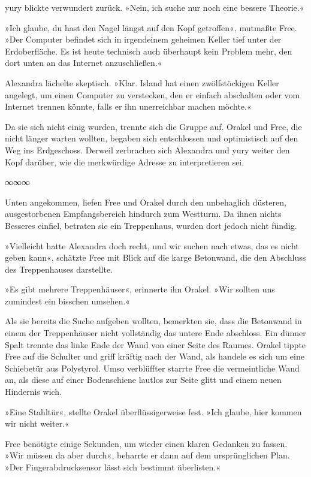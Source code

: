 yury blickte verwundert zurück. »Nein, ich suche nur noch eine bessere Theorie.«

»Ich glaube, du hast den Nagel längst auf den Kopf getroffen«, mutmaßte Free. »Der Computer befindet sich in irgendeinem geheimen Keller tief unter der Erdoberfläche. Es ist heute technisch auch überhaupt kein Problem mehr, den dort unten an das Internet anzuschließen.«

Alexandra lächelte skeptisch. »Klar. Island hat einen zwölfstöckigen Keller angelegt, um einen Computer zu verstecken, den er einfach abschalten oder vom Internet trennen könnte, falls er ihn unerreichbar machen möchte.«

Da sie sich nicht einig wurden, trennte sich die Gruppe auf. Orakel und Free, die nicht länger warten wollten, begaben sich entschlossen und optimistisch auf den Weg ins Erdgeschoss. Derweil zerbrachen sich Alexandra und yury weiter den Kopf darüber, wie die merkwürdige Adresse zu interpretieren sei.

\begin{center}
	∞∞∞
\end{center}

Unten angekommen, liefen Free und Orakel durch den unbehaglich düsteren, ausgestorbenen Empfangsbereich hindurch zum Westturm. Da ihnen nichts Besseres einfiel, betraten sie ein Treppenhaus, wurden dort jedoch nicht fündig.

»Vielleicht hatte Alexandra doch recht, und wir suchen nach etwas, das es nicht geben kann«, schätzte Free mit Blick auf die karge Betonwand, die den Abschluss des Treppenhauses darstellte.

»Es gibt mehrere Treppenhäuser«, erinnerte ihn Orakel. »Wir sollten uns zumindest ein bisschen umsehen.«

Als sie bereits die Suche aufgeben wollten, bemerkten sie, dass die Betonwand in einem der Treppenhäuser nicht vollständig das untere Ende abschloss. Ein dünner Spalt trennte das linke Ende der Wand von einer Seite des Raumes. Orakel tippte Free auf die Schulter und griff kräftig nach der Wand, als handele es sich um eine Schiebetür aus Polystyrol. Umso verblüffter starrte Free die vermeintliche Wand an, als diese auf einer Bodenschiene lautlos zur Seite glitt und einem neuen Hindernis wich.

»Eine Stahltür«, stellte Orakel überflüssigerweise fest. »Ich glaube, hier kommen wir nicht weiter.«

Free benötigte einige Sekunden, um wieder einen klaren Gedanken zu fassen. »Wir müssen da aber durch«, beharrte er dann auf dem ursprünglichen Plan. »Der Fingerabdrucksensor lässt sich bestimmt überlisten.«

